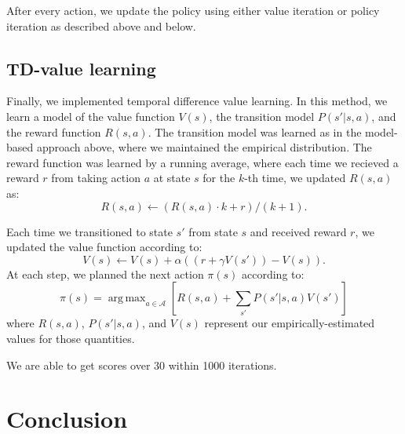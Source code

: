 \documentclass[11pt]{amsart}
\DeclareMathOperator*{\argmax}{arg\,max}
\begin{document}
After every action, we update the policy using either value iteration or policy iteration as described above and below.

\subsection{TD-value learning}

Finally, we implemented temporal difference value learning. In this method, we learn a model of the value function $V(s)$, the transition model $P(s'|s,a)$, and the reward function $R(s,a)$. The transition model was learned as in the model-based approach above, where we maintained the empirical distribution. The reward function was learned by a running average, where each time we recieved a reward $r$ from taking action $a$ at state $s$ for the $k$-th time, we updated $R(s,a)$ as:
$$R(s,a) \gets (R(s,a) \cdot k + r)/(k + 1).$$

Each time we transitioned to state $s'$ from state $s$ and received reward $r$, we updated the value function according to:
$$V(s) \gets V(s) + \alpha ((r + \gamma V(s')) - V(s)).$$
At each step, we planned the next action $\pi(s)$ according to:
$$\pi(s) = \argmax_{a \in \mathcal{A}} \left[ R(s,a) + \sum_{s'} P(s'|s,a) V(s') \right]$$
where $R(s,a)$, $P(s'|s,a)$, and $V(s)$ represent our empirically-estimated values for those quantities.

We are able to get scores over 30 within 1000 iterations.

\section{Conclusion}
\end{document}
